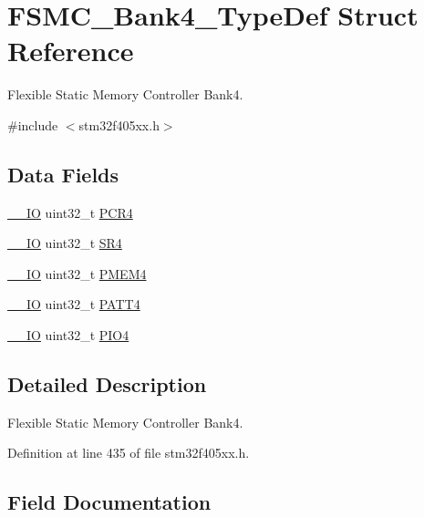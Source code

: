 \hypertarget{struct_f_s_m_c___bank4___type_def}{}\section{F\+S\+M\+C\+\_\+\+Bank4\+\_\+\+Type\+Def Struct Reference}
\label{struct_f_s_m_c___bank4___type_def}


Flexible Static Memory Controller Bank4.  




{\ttfamily \#include $<$stm32f405xx.\+h$>$}

\subsection*{Data Fields}
\begin{DoxyCompactItemize}
\item 
\hyperlink{core__sc300_8h_aec43007d9998a0a0e01faede4133d6be}{\+\_\+\+\_\+\+IO} uint32\+\_\+t \hyperlink{struct_f_s_m_c___bank4___type_def_a2f02e7acfbd7e549ede84633215eb6a1}{P\+C\+R4}
\item 
\hyperlink{core__sc300_8h_aec43007d9998a0a0e01faede4133d6be}{\+\_\+\+\_\+\+IO} uint32\+\_\+t \hyperlink{struct_f_s_m_c___bank4___type_def_a8218d6e11dae5d4468c69303dec0b4fc}{S\+R4}
\item 
\hyperlink{core__sc300_8h_aec43007d9998a0a0e01faede4133d6be}{\+\_\+\+\_\+\+IO} uint32\+\_\+t \hyperlink{struct_f_s_m_c___bank4___type_def_a3f82cc749845fb0dd7dfa8121d96b663}{P\+M\+E\+M4}
\item 
\hyperlink{core__sc300_8h_aec43007d9998a0a0e01faede4133d6be}{\+\_\+\+\_\+\+IO} uint32\+\_\+t \hyperlink{struct_f_s_m_c___bank4___type_def_a955cad1aab7fb2d5b6e216cb29b5e7e2}{P\+A\+T\+T4}
\item 
\hyperlink{core__sc300_8h_aec43007d9998a0a0e01faede4133d6be}{\+\_\+\+\_\+\+IO} uint32\+\_\+t \hyperlink{struct_f_s_m_c___bank4___type_def_ac53cd7a08093a4ae8f4de4bcff67a64f}{P\+I\+O4}
\end{DoxyCompactItemize}


\subsection{Detailed Description}
Flexible Static Memory Controller Bank4. 

Definition at line 435 of file stm32f405xx.\+h.



\subsection{Field Documentation}
